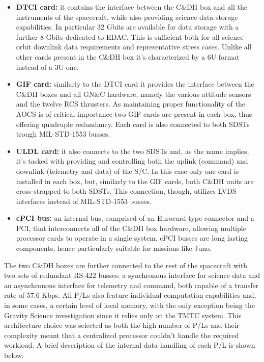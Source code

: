 \begin{itemize}
    \item \textbf{DTCI card:} it contains the interface between the C\&DH box and all the instruments of the spacecraft, while also providing science data storage capabilities. In particular 32 Gbits are available for data storage with a further 8 Gbits dedicated to EDAC. This is sufficient both for all science orbit downlink data requirements and representative stress cases. Unlike all other cards present in the C\&DH box it's characterized by a 6U format instead of a 3U one. \cite{juno_sito}
    \item \textbf{GIF card:} similarly to the DTCI card it provides the interface between the C\&DH boxes and all GN\&C hardware, namely the various attitude sensors and the twelve RCS thrusters. As maintaining proper functionality of the AOCS is of critical importance two GIF cards are present in each box, thus offering quadruple redundancy. Each card is also connected to both SDSTs trough MIL-STD-1553 \cite{MIL-STD-1553} busses. \cite{juno_telecommunication}   
    \item \textbf{ULDL card:} it also connects to the two SDSTs and, as the name implies, it's tasked with providing and controlling both the uplink (command) and downlink (telemetry and data) of the S/C. In this case only one card is installed in each box, but, similarly to the GIF cards, both C\&DH units are cross-strapped to both SDSTs. This connection, though, utilizes LVDS interfaces instead of MIL-STD-1553 busses. \cite{juno_telecommunication}  
    \item \textbf{cPCI bus:} an internal bus, comprised of an Eurocard-type connector and a PCI, that interconnects all of the C\&DH box hardware, allowing multiple processor cards to operate in a single system. cPCI busses are long lasting components, hence particularly suitable for missions like Juno.
    

\end{itemize}
The two C\&DH boxes are further connected to the rest of the spacecraft with two sets of redundant RS-422 busses: a synchronous interface for science data and an asynchronous interface for telemetry and command, both capable of a transfer rate of 57.6 Kbps. \cite{UVS_info} \cite{MWR_info} 
All P/Ls also feature individual computation capabilities and, in some cases, a certain level of local memory, with the only exception being the Gravity Science investigation since it relies only on the TMTC system. This architecture choice was selected as both the high number of P/Ls and their complexity meant that a centralized processor couldn't handle the required workload. A brief description of the internal data handling of each P/L is shown below:
